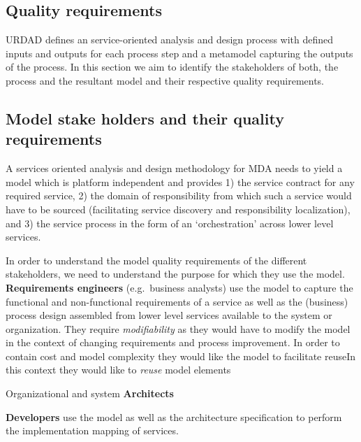 \subsection{Quality requirements}


URDAD defines an service-oriented analysis and design process with defined inputs and outputs for each process step and a metamodel capturing the outputs of the process. In this section we aim to identify the stakeholders of both, the process and the resultant model and their respective quality requirements.

\subsection{Model stake holders and their quality requirements}

A services oriented analysis and design methodology for MDA needs to yield a model which is platform independent and provides 1) the service contract for any required service, 2) the domain of responsibility from which such a service would have to be sourced (facilitating service discovery and responsibility localization), and 3) the service process in the form of an `orchestration' across lower level services\cite{}.

In order to understand the model quality requirements of the different stakeholders, we need to understand the purpose for which they use the model\cite{lange_christiaan_assessing_2007}. {\bf Requirements engineers} (e.g.\ business analysts) use the model to capture the functional and non-functional requirements of a service as well as the (business) process design assembled from lower level services available to the system or organization. They require \emph{modifiability} as they would have to modify the model in the context of changing requirements and process improvement. In order to contain cost and model complexity they would like the model to facilitate reuseIn this context they would like to \emph{reuse} model elements

Organizational and system {\bf Architects}

{\bf Developers} use the model as well as the architecture specification to perform the implementation mapping of services.




